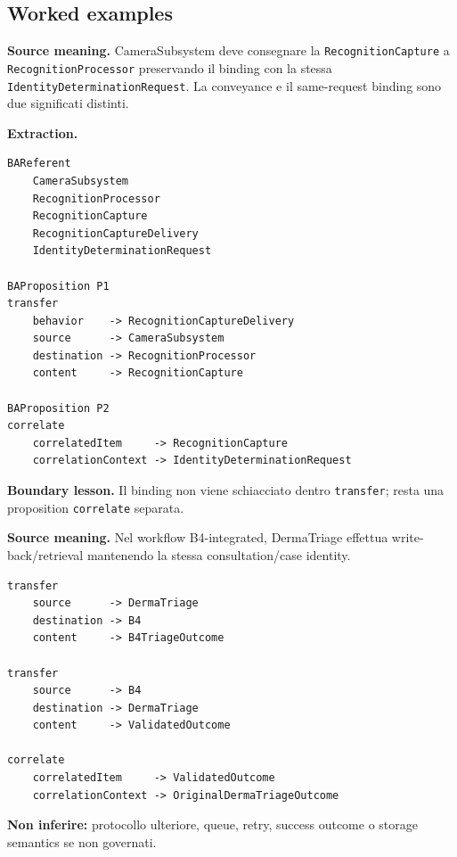 \documentclass[11pt,a4paper]{article}
\begin{document}
\subsection{Worked examples}
\begin{ddtaexample}[title={Facial Access - FR-3.4.2: delivery della RecognitionCapture}]
\textbf{Source meaning.} CameraSubsystem deve consegnare la \texttt{RecognitionCapture} a \texttt{RecognitionProcessor} preservando il binding con la stessa \texttt{IdentityDeterminationRequest}. La conveyance e il same-request binding sono due significati distinti.\par
\medskip
\textbf{Extraction.}
\begin{lstlisting}
BAReferent
    CameraSubsystem
    RecognitionProcessor
    RecognitionCapture
    RecognitionCaptureDelivery
    IdentityDeterminationRequest

BAProposition P1
transfer
    behavior    -> RecognitionCaptureDelivery
    source      -> CameraSubsystem
    destination -> RecognitionProcessor
    content     -> RecognitionCapture

BAProposition P2
correlate
    correlatedItem     -> RecognitionCapture
    correlationContext -> IdentityDeterminationRequest
\end{lstlisting}
\textbf{Boundary lesson.} Il binding non viene schiacciato dentro \texttt{transfer}; resta una proposition \texttt{correlate} separata.
\end{ddtaexample}

\begin{ddtaexample}[title={DermaTriage - FR-23: scambio B4 con case identity preservata}]
\textbf{Source meaning.} Nel workflow B4-integrated, DermaTriage effettua write-back/retrieval mantenendo la stessa consultation/case identity.\par
\begin{lstlisting}
transfer
    source      -> DermaTriage
    destination -> B4
    content     -> B4TriageOutcome

transfer
    source      -> B4
    destination -> DermaTriage
    content     -> ValidatedOutcome

correlate
    correlatedItem     -> ValidatedOutcome
    correlationContext -> OriginalDermaTriageOutcome
\end{lstlisting}
\textbf{Non inferire:} protocollo ulteriore, queue, retry, success outcome o storage semantics se non governati.
\end{ddtaexample}


\end{document}
